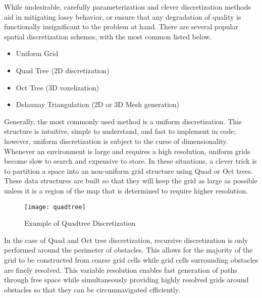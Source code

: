 While undesirable, carefully parameterization and clever discretization methods aid in mitigating lossy behavior, or ensure that any degradation of quality is functionally insignificant to the problem at hand. There are several popular spatial discretization schemes, with the most common listed below. 

\begin{itemize}
  \item Uniform Grid
  \item Quad Tree (2D discretization)
  \item Oct Tree (3D voxelization)
  \item Delaunay Triangulation (2D or 3D Mesh generation)
\end{itemize}


Generally, the most commonly used method is a uniform discretization. This structure is intuitive, simple to understand, and fast to implement in code; however, uniform discretization is subject to the curse of dimensionality. Whenever an environment is large and requires a high resolution, uniform grids become slow to search and expensive to store. In these situations, a clever trick is to partition a space into an non-uniform grid structure using Quad or Oct trees. These data structures are built so that they will keep the grid as large as possible unless it is a region of the map that is determined to require higher resolution. 

\begin{figure}[ht]
  \texttt{[image: quadtree]}
  \centering
  \label{fig:quadtree}
  \caption{Example of Quadtree Discretization}
\end{figure}

In the case of Quad and Oct tree discretization, recursive discretization is only performed around the perimeter of obstacles. This allows for the majority of the grid to be constructed from coarse grid cells while grid cells surrounding obstacles are finely resolved. This variable resolution enables fast generation of paths through free space while simultaneously providing highly resolved grids around obstacles so that they can be circumnavigated efficiently.



